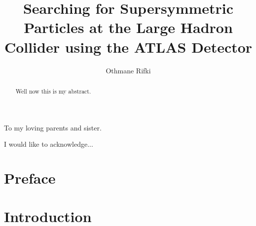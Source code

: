 \documentclass{outhesis}
\begin{document}
\author{Othmane Rifki}
\title{Searching for Supersymmetric Particles at the Large Hadron Collider using the ATLAS Detector}
\address{Norman, Oklahoma}

\begin{dedication}
  To my loving parents and sister.
\end{dedication}

\begin{acknowledgements}
  I would like to acknowledge...
\end{acknowledgements}


\begin{abstract}

Well now this is my abstract.

\end{abstract}


\frontmatter

\maketitle

\mainmatter


\chapter*{Preface}\label{sec:pre}


\chapter*{Introduction}\label{sec:intro}

\end{document}

